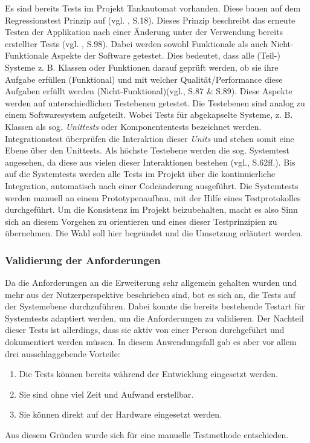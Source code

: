 Es sind bereits Tests im Projekt Tankautomat vorhanden. Diese bauen auf dem Regressionstest Prinzip auf (vgl. \cite{Ba_Miriam}, S.18). Dieses Prinzip beschreibt das erneute Testen der Applikation nach einer Änderung unter der Verwendung bereits erstellter Tests (vgl. \cite{Basis_Tests}, S.98). Dabei werden sowohl Funktionale als auch Nicht-Funktionale Aspekte der Software getestet. Dies bedeutet, dass alle (Teil-) Systeme z. B. Klassen oder Funktionen darauf geprüft werden, ob sie ihre Aufgabe erfüllen (Funktional) und mit welcher Qualität/Performance diese Aufgaben erfüllt werden (Nicht-Funktional)(vgl.\cite{Basis_Tests}, S.87 \& S.89). Diese Aspekte werden auf unterschiedlichen Testebenen getestet. Die Testebenen sind analog zu einem Softwaresystem aufgeteilt. Wobei Tests für abgekapselte Systeme, z. B. Klassen als sog. \textit{Unittests} oder Komponententests bezeichnet werden. Integrationstest überprüfen die Interaktion dieser \textit{Units} und stehen somit eine Ebene über den Unittests. Als höchste Testebene werden die sog. Systemtest angesehen, da diese aus vielen dieser Interaktionen bestehen (vgl.\cite{Basis_Tests}, S.62ff.). Bis auf die Systemtests werden alle Tests im Projekt über die kontinuierliche Integration, automatisch nach einer Codeänderung ausgeführt. Die Systemtests werden manuell an einem Prototypenaufbau, mit der Hilfe eines Testprotokolles durchgeführt. Um die Konsistenz im Projekt beizubehalten, macht es also Sinn sich an diesem Vorgehen zu orientieren und eines dieser Testprinzipien zu übernehmen. Die Wahl soll hier begründet und die Umsetzung erläutert werden.
\subsubsection{Validierung der Anforderungen}
Da die Anforderungen an die Erweiterung sehr allgemein gehalten wurden und mehr aus der Nutzerperspektive beschrieben sind, bot es sich an, die Tests auf der Systemebene durchzuführen. Dabei konnte die bereits bestehende Testart für Systemtests adaptiert werden, um die Anforderungen zu validieren. Der Nachteil dieser Tests ist allerdings, dass sie aktiv von einer Person durchgeführt und dokumentiert werden müssen. In diesem Anwendungsfall gab es aber vor allem drei ausschlaggebende Vorteile:
\begin{enumerate}
	\item Die Tests können bereits während der Entwicklung eingesetzt werden.
	\item Sie sind ohne viel Zeit und Aufwand erstellbar.
	\item Sie können direkt auf der Hardware eingesetzt werden.
\end{enumerate}
Aus diesem Gründen wurde sich für eine manuelle Testmethode entschieden.
